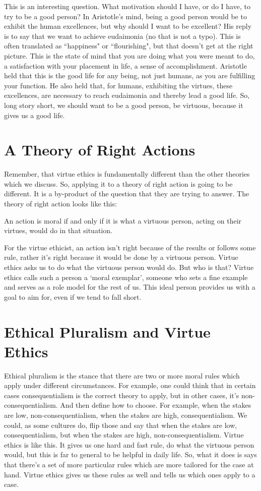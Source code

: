 This is an interesting question. What motivation should I have, or do I have, to try to be a good person? In Aristotle's mind, being a good person would be to exhibit the human excellences, but why should I want to be excellent? His reply is to say that we want to achieve eudaimonia (no that is not a typo). This is often translated as ``happiness" or ``flourishing", but that doesn't get at the right picture. This is the state of mind that you are doing what you were meant to do, a satisfaction with your placement in life, a sense of accomplishment. Aristotle held that this is the good life for any being, not just humans, as you are fulfilling your function. He also held that, for humans, exhibiting the virtues, these excellences, are necessary to reach eudaimonia and thereby lead a good life. So, long story short, we should want to be a good person, be virtuous, because it gives us a good life. 

\section{A Theory of Right Actions}

Remember, that virtue ethics is fundamentally different than the other theories which we discuss. So, applying it to a theory of right action is going to be different. It is a by-product of the question that they are trying to answer. The theory of right action looks like this:
\begin{center}
An action is moral if and only if it is what a virtuous person, acting on their virtues, would do in that situation.
\end{center}
For the virtue ethicist, an action isn’t right because of the results or follows some rule, rather it’s right because it would be done by a virtuous person. Virtue ethics asks us to do what the virtuous person would do. But who is that? Virtue ethics calls such a person a ‘moral exemplar’, someone who sets a fine example and serves as a role model for the rest of us. This ideal person provides us with a goal to aim for, even if we tend to fall short.
\section{Ethical Pluralism and Virtue Ethics}

Ethical pluralism is the stance that there are two or more moral rules which apply under different circumstances. For example, one could think that in certain cases consequentialism is the correct theory to apply, but in other cases, it’s non-consequentialism. And then define how to choose. For example, when the stakes are low, non-consequentialism, when the stakes are high, consequentialism. We could, as some cultures do, flip those and say that when the stakes are low, consequentialism, but when the stakes are high, non-consequentialism. Virtue ethics is like this. It gives us one hard and fast rule, do what the virtuous person would, but this is far to general to be helpful in daily life. So, what it does is says that there’s a set of more particular rules which are more tailored for the case at hand. Virtue ethics gives us these rules as well and tells us which ones apply to a case.


